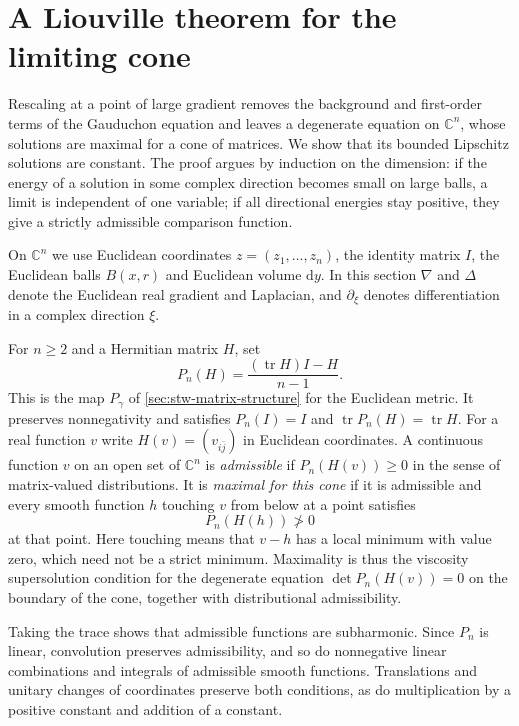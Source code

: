 \section{A Liouville theorem for the limiting cone}
\label{sec:stw-liouville}

Rescaling at a point of large gradient removes the background and first-order terms of the Gauduchon equation and leaves a degenerate equation on $\mathbb C^n$, whose solutions are maximal for a cone of matrices. We show that its bounded Lipschitz solutions are constant. The proof argues by induction on the dimension: if the energy of a solution in some complex direction becomes small on large balls, a limit is independent of one variable; if all directional energies stay positive, they give a strictly admissible comparison function.

On $\mathbb C^n$ we use Euclidean coordinates $z=(z_1,\ldots,z_n)$, the identity matrix $I$, the Euclidean balls $B(x,r)$ and Euclidean volume $\mathrm{d}y$. In this section $\nabla$ and $\Delta$ denote the Euclidean real gradient and Laplacian, and $\partial_\xi$ denotes differentiation in a complex direction $\xi$.

For $n\geq2$ and a Hermitian matrix $H$, set
\[
 P_n(H)=\frac{(\operatorname{tr}H)I-H}{n-1}.
\]
This is the map $P_\gamma$ of \cref{sec:stw-matrix-structure} for the Euclidean metric. It preserves nonnegativity and satisfies $P_n(I)=I$ and $\operatorname{tr}P_n(H)=\operatorname{tr}H$. For a real function $v$ write $H(v)=(v_{i\bar j})$ in Euclidean coordinates. A continuous function $v$ on an open set of $\mathbb C^n$ is \emph{admissible} if $P_n(H(v))\geq0$ in the sense of matrix-valued distributions. It is \emph{maximal for this cone} if it is admissible and every smooth function $h$ touching $v$ from below at a point satisfies
\[
 P_n(H(h))\not>0
\]
at that point. Here touching means that $v-h$ has a local minimum with value zero, which need not be a strict minimum. Maximality is thus the viscosity supersolution condition for the degenerate equation $\det P_n(H(v))=0$ on the boundary of the cone, together with distributional admissibility.

Taking the trace shows that admissible functions are subharmonic. Since $P_n$ is linear, convolution preserves admissibility, and so do nonnegative linear combinations and integrals of admissible smooth functions. Translations and unitary changes of coordinates preserve both conditions, as do multiplication by a positive constant and addition of a constant.

